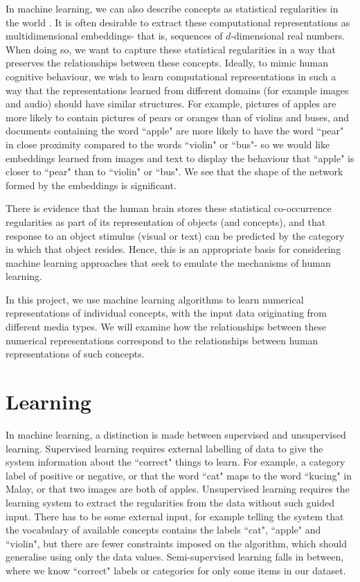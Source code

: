 In machine learning, we can  also describe concepts as statistical regularities in the world \cite{RoadsLoveNatureMachineIntelligence}. It is often desirable to extract these computational representations as multidimensional embeddings- that is, sequences of $d$-dimensional real numbers. When doing so, we want to capture these statistical regularities in a way that preserves the relationships between these concepts. Ideally, to mimic human cognitive behaviour, we wish to learn computational representations in such a way that the representations learned from different domains (for example images and audio) should have similar structures. For example, pictures of apples are more likely to contain pictures of pears or oranges than of violins and buses, and documents containing the word ``apple" are more likely to have the word ``pear" in close proximity compared to the words ``violin" or ``bus"- so we would like embeddings learned from images and text to display the behaviour that ``apple" is closer to ``pear" than to ``violin" or ``bus". We see that the shape of the network formed by the embeddings is significant. 

There is evidence \cite{CoocurrenceVisionLanguage2021} that the human brain stores these statistical co-occurrence regularities  as part of its representation of objects (and concepts), and that response to an object stimulus (visual or text) can be predicted by the category in which that object resides. Hence, this is an appropriate basis for considering machine learning approaches that seek to emulate the mechanisms of human learning. 

In this project, we use machine learning algorithms to learn numerical representations of individual concepts, with the input data originating from different media types. We will examine how the relationships between these numerical representations correspond to the relationships between human representations of such concepts. 

\section{Learning}
In machine learning, a distinction is made between supervised and unsupervised learning. Supervised learning requires external labelling of data to give the system information about the ``correct" things to learn. For example, a category label of positive or negative, or that the word ``cat" maps to the word ``kucing" in Malay, or that two images are both of apples. Unsupervised learning requires the learning system to extract the regularities from the data without such guided input. There has to be some external input, for example telling the system that the vocabulary of available concepts contains the labels ``cat", ``apple" and ``violin", but there are fewer constraints imposed on the algorithm, which should generalise using only the data values. Semi-supervised learning falls in between, where we know ``correct" labels or categories for only some items in our dataset. 

